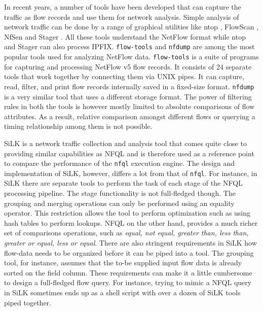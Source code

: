 In recent years, a number of tools have been developed that can capture the
traffic as flow records and use them for network analysis. Simple analysis of
network traffic can be done by a range of graphical utilities like ntop
\cite{ntop:2000}, FlowScan \cite{flowscan:2000}, NfSen \cite{phaag:2006} and
Stager \cite{oslebo:2006}. All these tools understand the NetFlow format while
ntop and Stager can also process \ac{IPFIX}. \texttt{flow-tools} and
\texttt{nfdump} are among the most popular tools used for analyzing NetFlow
data. \texttt{flow-tools} \cite{sromig:2000} is a suite of programs for
capturing and processing NetFlow v5 flow records. It consists of 24 separate
tools that work together by connecting them via UNIX pipes. It can capture,
read, filter, and print flow records internally saved in a fixed-size format.
\texttt{nfdump} \cite{phaag:2006} is a very similar tool that uses a different
storage format. The power of filtering rules in both the tools is however
mostly limited to absolute comparisons of flow attributes. As a result,
relative comparison amongst different flows or querying a timing relationship
among them is not possible.


SiLK \cite{SiLK} is a network traffic collection and analysis tool that comes
quite close to providing similar capabilities as \ac{NFQL} and is therefore
used as a reference point to compare the performance of the \texttt{nfql}
execution engine. The design and implementation of SiLK, however, differs a
lot from that of \texttt{nfql}. For instance, in SiLK there are separate tools to
perform the task of each stage of the \ac{NFQL} processing pipeline. The stage
functionality is not full-fledged though. The grouping and merging operations
can only be performed using an equality operator. This restriction allows the
tool to perform optimization such as using hash tables to perform lookups.
\ac{NFQL} on the other hand, provides a much richer set of comparisons
operations, such as \emph{equal, not equal, greater than, less than, greater
or equal, less or equal}. There are also stringent requirements in SiLK how
flow-data needs to be organized before it can be piped into a tool. The
grouping tool, for instance, assumes that the to-be supplied input flow data
is already sorted on the field column.  These requirements can make it a
little cumbersome to design a full-fledged flow query.  For instance, trying
to mimic a \ac{NFQL} query in SiLK sometimes ends up as a shell script with
over a dozen of SiLK tools piped together.

